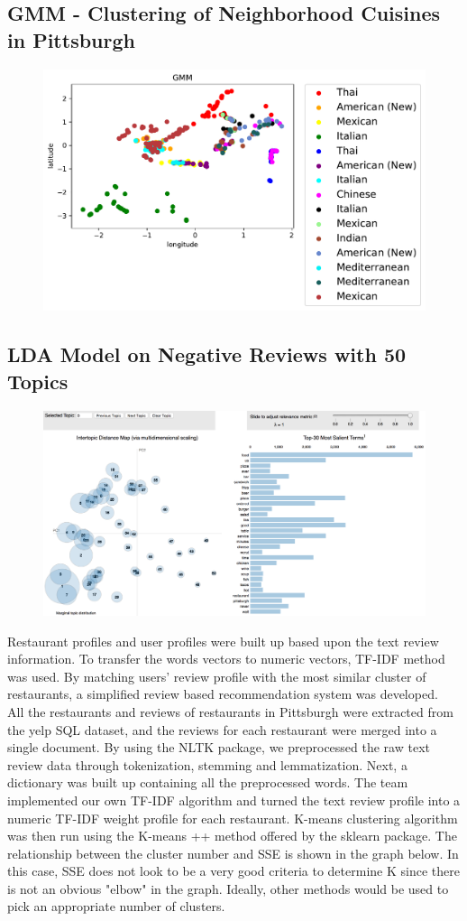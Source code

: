\documentclass{neu_handout}
\begin{document}
\subsection{GMM - Clustering of Neighborhood Cuisines in Pittsburgh}
\begin{figure}[h]
\centering
{
\includegraphics[width=0.5\linewidth]{gmm_cuisines}
}
\end{figure}

\subsection{LDA Model on Negative Reviews with 50 Topics}
\begin{figure}[h]
\centering
{
\includegraphics[width=0.6\linewidth]{first_image}
}
\end{figure}

Restaurant profiles and user profiles were built up based upon the text review information. To transfer the words vectors to numeric vectors, TF-IDF method was used. By matching users’ review profile with the most similar cluster of restaurants, a simplified review based recommendation system was developed.\\

All the restaurants and reviews of restaurants in Pittsburgh were extracted from the yelp SQL dataset, and the reviews for each restaurant were merged into a single document. By using the NLTK package, we preprocessed the raw text review data through tokenization, stemming and lemmatization. Next, a dictionary was built up containing all the preprocessed words. The team implemented our own TF-IDF algorithm and turned the text review profile into a numeric TF-IDF weight profile for each restaurant. K-means clustering algorithm was then run using the K-means ++ method offered by the sklearn package. The relationship between the cluster number and SSE is shown in the graph below. In this case, SSE does not look to be a very good criteria to determine K since there is not an obvious "elbow" in the graph. Ideally, other methods would be used to pick an appropriate number of clusters. 
\end{document}

